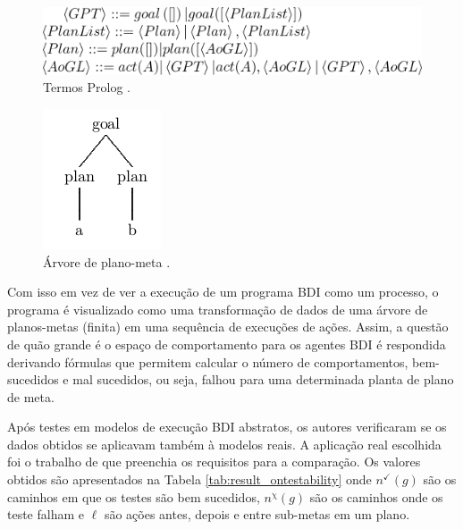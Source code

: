 \begin{figure}[ht]
\centering
\includegraphics[scale=0.3]{imagens/code.png}
\caption{Termos Prolog \cite{winikoff2014testability}.}
\label{fig:prolog}
\end{figure}

\begin{figure}[ht]
\centering
\includegraphics[scale=0.7]{imagens/simple_tree.png}
\caption{Árvore de plano-meta \cite{winikoff2014testability}.}
\label{fig:arvore}
\end{figure}

Com isso em vez de ver a execução de um programa BDI como um processo, o programa é visualizado como uma transformação de dados de uma árvore de planos-metas (finita) em uma sequência de execuções de ações. Assim, a questão de quão grande é o espaço de comportamento para os agentes BDI é respondida derivando fórmulas que permitem calcular o número de comportamentos, bem-sucedidos e mal sucedidos, ou seja, falhou para uma determinada planta de plano de meta.

Após testes em modelos de execução BDI abstratos, os autores verificaram se os dados obtidos se aplicavam também à modelos reais. A aplicação real escolhida foi o trabalho de \cite{burmeister2008bdi} que preenchia os requisitos para a comparação. Os valores obtidos são apresentados na Tabela \ref{tab:result_ontestability} onde $n^{\checkmark}(g)$ são os caminhos em que os testes são bem sucedidos, $n^{\upchi}(g)$ são os caminhos onde os teste falham e $\ell$ são ações antes, depois e entre sub-metas em um plano.

